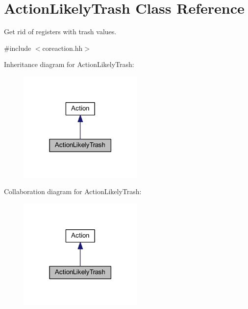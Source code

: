 \hypertarget{class_action_likely_trash}{}\section{Action\+Likely\+Trash Class Reference}
\label{class_action_likely_trash}


Get rid of registers with trash values.  




{\ttfamily \#include $<$coreaction.\+hh$>$}



Inheritance diagram for Action\+Likely\+Trash\+:
\nopagebreak
\begin{figure}[H]
\begin{center}
\leavevmode
\includegraphics[width=174pt]{class_action_likely_trash__inherit__graph}
\end{center}
\end{figure}


Collaboration diagram for Action\+Likely\+Trash\+:
\nopagebreak
\begin{figure}[H]
\begin{center}
\leavevmode
\includegraphics[width=174pt]{class_action_likely_trash__coll__graph}
\end{center}
\end{figure}
